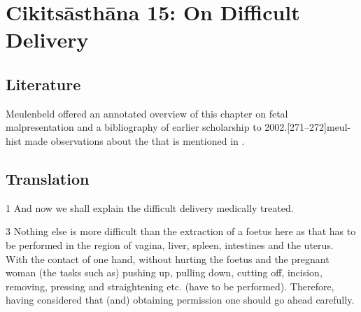 
\chapter{Cikitsāsthāna 15:  On Difficult Delivery}


\section{Literature} 

Meulenbeld offered an annotated overview of this chapter on fetal
malpresentation and a bibliography of earlier scholarship to
2002.[271--272]{meul-hist}  \citet[517]{das-2003} made 
observations about the  that is mentioned in  
. 

\section{Translation}

\begin{translation}
    
    \item [1] And now we shall explain the difficult delivery medically treated.
    
    \item [3] Nothing else is more difficult than the extraction of a foetus here as that has to be performed in the region of vagina, liver, spleen, intestines and the uterus. With the contact of one hand, without hurting the foetus and the pregnant woman (the tasks such as) pushing up, pulling down, cutting off, incision, removing, pressing and straightening etc. (have to be performed). Therefore, having considered that (and) obtaining permission one should go ahead carefully.
    
\end{translation}

